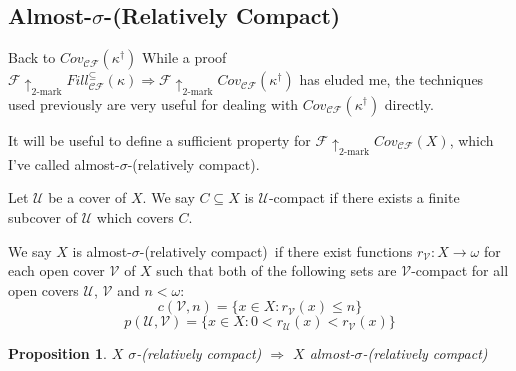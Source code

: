 \documentclass{beamer}
\theoremstyle{theorem}
\newtheorem{proposition}[theorem]{Proposition}
\theoremstyle{definition}
\newcommand{\kmarkwin}[1]{\uparrow_{#1\text{-mark}}}
\newcommand{\oneptlind}[1]{#1^\dagger}
\newcommand{\mengame}[1]{Cov_{\pl C\pl F}(#1)}
\newcommand{\kfillgame}[1]{Fill^{\subseteq}_{\pl C\pl F}(#1)}
\newcommand{\<}{\langle}
\renewcommand{\>}{\rangle}
\newcommand{\mc}[1]{\mathcal{#1}}
\newcommand{\scish}{almost-$\sigma$-(relatively compact)}
\newcommand{\pl}[1]{\mathscr{#1}}
\begin{document}
\subsection{Almost-$\sigma$-(Relatively Compact)}

\begin{frame}{Back to $\mengame{\oneptlind{\kappa}}$}
  While a proof $\pl F \kmarkwin{2} \kfillgame{\kappa}\Rightarrow \pl F \kmarkwin{2} \mengame{\oneptlind{\kappa}}$ has eluded me, the techniques used previously are very useful for dealing with $\mengame{\oneptlind{\kappa}}$ directly.

  \pause\vspace{12pt}

  It will be useful to define a sufficient property for $\pl F \kmarkwin{2} \mengame{X}$, which I've called \scish{}.
\end{frame}

\begin{frame}
  \begin{definition}
    Let $\mc U$ be a cover of $X$. We say $C\subseteq X$ is $\mc U$-compact if there exists a finite subcover of $\mc U$ which covers $C$.\vspace{6pt}

    We say $X$ is \scish~if there exist functions $r_{\mc V}:X\to\omega$ for each open cover $\mc V$ of $X$ such that both of the following sets are $\mc V$-compact for all open covers $\mc U$, $\mc V$ and $n<\omega$:
      \[
        c(\mc V,n)=\{ x\in X : r_{\mc V}(x)\leq n\}
      \]
      \[
        p(\mc U,\mc V)=\{ x\in X : 0<r_{\mc U}(x)<r_{\mc V}(x)\}
      \]

  \end{definition}\pause

  \begin{proposition}
    $X$ $\sigma$-(relatively compact) $\Rightarrow$ $X$ \scish
  \end{proposition}
\end{frame}
\end{document}
